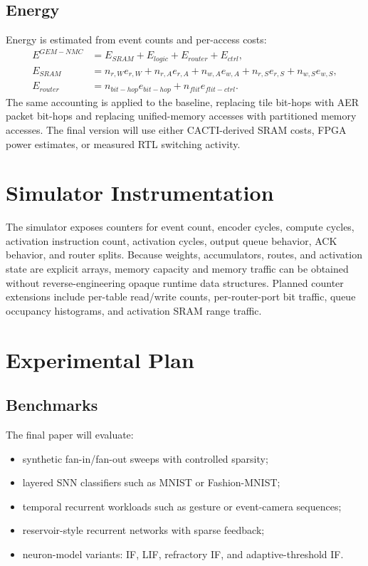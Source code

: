 \documentclass[10pt,conference]{IEEEtran}
\newcommand{\arch}{GEM-NMC}
\begin{document}
\subsection{Energy}
Energy is estimated from event counts and per-access costs:
\begin{align}
    E^{\arch} &= E_{SRAM}+E_{logic}+E_{router}+E_{ctrl},\\
    E_{SRAM} &= n_{r,W}e_{r,W}+n_{r,A}e_{r,A}+n_{w,A}e_{w,A}+n_{r,S}e_{r,S}+n_{w,S}e_{w,S},\\
    E_{router} &= n_{bit-hop}e_{bit-hop}+n_{flit}e_{flit-ctrl}.
\end{align}
The same accounting is applied to the baseline, replacing tile bit-hops with AER packet bit-hops and replacing unified-memory accesses with partitioned memory accesses. The final version will use either CACTI-derived SRAM costs, FPGA power estimates, or measured RTL switching activity.

\section{Simulator Instrumentation}
The simulator exposes counters for event count, encoder cycles, compute cycles, activation instruction count, activation cycles, output queue behavior, ACK behavior, and router splits. Because weights, accumulators, routes, and activation state are explicit arrays, memory capacity and memory traffic can be obtained without reverse-engineering opaque runtime data structures. Planned counter extensions include per-table read/write counts, per-router-port bit traffic, queue occupancy histograms, and activation SRAM range traffic.

\section{Experimental Plan}
\subsection{Benchmarks}
The final paper will evaluate:
\begin{itemize}
    \item synthetic fan-in/fan-out sweeps with controlled sparsity;
    \item layered SNN classifiers such as MNIST or Fashion-MNIST;
    \item temporal recurrent workloads such as gesture or event-camera sequences;
    \item reservoir-style recurrent networks with sparse feedback;
    \item neuron-model variants: IF, LIF, refractory IF, and adaptive-threshold IF.
\end{itemize}
\end{document}
